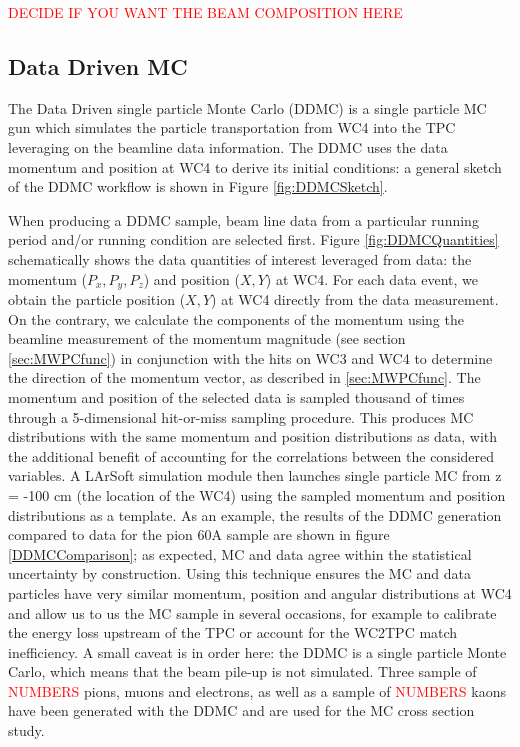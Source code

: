 \textcolor{red}{DECIDE IF YOU WANT THE BEAM COMPOSITION HERE}


\subsection{Data Driven MC}\label{sec:DDMC}
The Data Driven single particle Monte Carlo (DDMC) is a single particle MC gun which simulates the particle transportation from WC4 into the TPC leveraging on the beamline data information. The DDMC uses the data momentum and position at WC4 to derive its initial conditions: a general sketch of the DDMC workflow is shown in Figure \ref{fig:DDMCSketch}.

When producing a DDMC sample, beam line data from a particular running period and/or running condition are selected first. Figure \ref{fig:DDMCQuantities}  schematically shows the data quantities of interest leveraged from data: the momentum ($P_x, P_y, P_z$) and position ($X, Y$) at WC4. For each data event, we obtain the particle position ($X, Y$) at WC4 directly from the data measurement. On the contrary, we calculate the components of the momentum using the beamline measurement of the momentum magnitude (see section \ref{sec:MWPCfunc}) in conjunction with the hits on WC3 and WC4 to determine the direction of the momentum vector, as described in \ref{sec:MWPCfunc}. The momentum and position of the selected data is sampled thousand of times through a 5-dimensional hit-or-miss sampling procedure. This produces MC distributions with the same momentum and position distributions as data, with the additional benefit of accounting for the correlations between the considered variables. A LArSoft simulation module then launches single particle MC from z = -100 cm (the location of the WC4) using the sampled momentum and position distributions as a template. 
As an example, the results of the DDMC generation compared to data for the pion 60A sample are shown in figure \ref{DDMCComparison}; as expected, MC and data agree within the statistical uncertainty by construction. Using this technique ensures the MC and data particles have very similar momentum, position and angular distributions at WC4 and allow us to us the MC sample in several occasions, for example to calibrate the energy loss upstream of the TPC or account for the WC2TPC match inefficiency. A small caveat is in order here: the DDMC is a single particle Monte Carlo, which means that the beam pile-up is not simulated. 
Three sample of \textcolor{red}{NUMBERS} pions, muons and electrons, as well as  a sample of \textcolor{red}{NUMBERS} kaons have been generated with the DDMC and are used for the MC cross section study.

